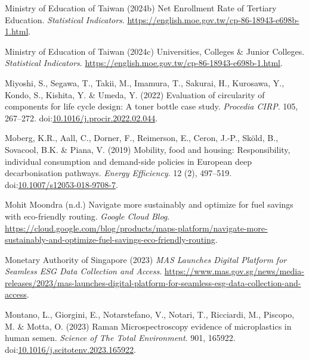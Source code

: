 \documentclass[
  letterpaper,
  DIV=11,
  numbers=noendperiod]{scrartcl}
\newlength{\cslhangindent}
\newenvironment{CSLReferences}[2] %
 {\begin{list}{}{%
  \setlength{\itemindent}{0pt}
  \setlength{\leftmargin}{0pt}
  \setlength{\parsep}{0pt}
  \ifodd #1
   \setlength{\leftmargin}{\cslhangindent}
   \setlength{\itemindent}{-1\cslhangindent}
  \fi
  \setlength{\itemsep}{#2\baselineskip}}}
 {\end{list}}
\begin{document}
\begin{CSLReferences}{0}{1}
Ministry of Education of Taiwan (2024b) Net {Enrollment Rate} of
{Tertiary Education}. \emph{Statistical Indicators}.
\url{https://english.moe.gov.tw/cp-86-18943-e698b-1.html}.

Ministry of Education of Taiwan (2024c) Universities, {Colleges} \&
{Junior Colleges}. \emph{Statistical Indicators}.
\url{https://english.moe.gov.tw/cp-86-18943-e698b-1.html}.

Miyoshi, S., Segawa, T., Takii, M., Imamura, T., Sakurai, H., Kurosawa,
Y., Kondo, S., Kishita, Y. \& Umeda, Y. (2022) Evaluation of circularity
of components for life cycle design: {A} toner bottle case study.
\emph{Procedia CIRP}. 105, 267--272.
doi:\href{https://doi.org/10.1016/j.procir.2022.02.044}{10.1016/j.procir.2022.02.044}.

Moberg, K.R., Aall, C., Dorner, F., Reimerson, E., Ceron, J.-P., Sköld,
B., Sovacool, B.K. \& Piana, V. (2019) Mobility, food and housing:
Responsibility, individual consumption and demand-side policies in
{European} deep decarbonisation pathways. \emph{Energy Efficiency}. 12
(2), 497--519.
doi:\href{https://doi.org/10.1007/s12053-018-9708-7}{10.1007/s12053-018-9708-7}.

Mohit Moondra (n.d.) Navigate more sustainably and optimize for fuel
savings with eco-friendly routing. \emph{Google Cloud Blog}.
\url{https://cloud.google.com/blog/products/maps-platform/navigate-more-sustainably-and-optimize-fuel-savings-eco-friendly-routing}.

Monetary Authority of Singapore (2023) \emph{{MAS Launches Digital
Platform} for {Seamless ESG Data Collection} and {Access}}.
\url{https://www.mas.gov.sg/news/media-releases/2023/mas-launches-digital-platform-for-seamless-esg-data-collection-and-access}.

Montano, L., Giorgini, E., Notarstefano, V., Notari, T., Ricciardi, M.,
Piscopo, M. \& Motta, O. (2023) Raman {Microspectroscopy} evidence of
microplastics in human semen. \emph{Science of The Total Environment}.
901, 165922.
doi:\href{https://doi.org/10.1016/j.scitotenv.2023.165922}{10.1016/j.scitotenv.2023.165922}.


\end{CSLReferences}
\end{document}

